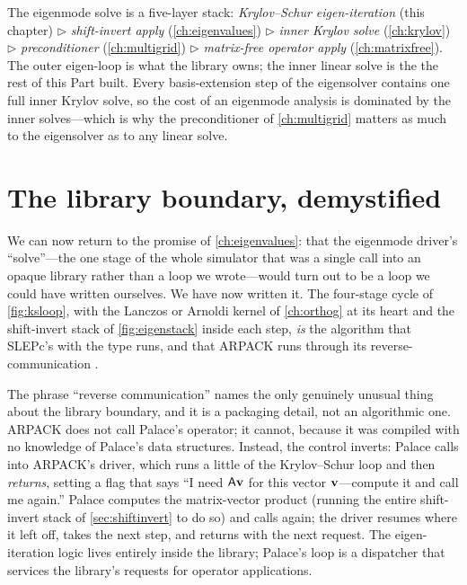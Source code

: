 \begin{keyidea}
The eigenmode solve is a five-layer stack: \emph{Krylov--Schur eigen-iteration} (this chapter)
$\triangleright$ \emph{shift-invert apply} (\cref{ch:eigenvalues}) $\triangleright$ \emph{inner
Krylov solve} (\cref{ch:krylov}) $\triangleright$ \emph{preconditioner} (\cref{ch:multigrid})
$\triangleright$ \emph{matrix-free operator apply} (\cref{ch:matrixfree}). The outer eigen-loop is
what the library owns; the inner linear solve is the  the rest of this Part built.
Every basis-extension step of the eigensolver contains one full inner Krylov solve, so the cost of
an eigenmode analysis is dominated by the inner solves---which is why the preconditioner of
\cref{ch:multigrid} matters as much to the eigensolver as to any linear solve.
\end{keyidea}

\section{The library boundary, demystified}
\label{sec:libraryboundary}

We can now return to the promise of \cref{ch:eigenvalues}: that the eigenmode driver's
``solve''---the one stage of the whole simulator that was a single call into an opaque library
rather than a loop we wrote---would turn out to be a loop we could have written ourselves. We have
now written it. The four-stage cycle of \cref{fig:ksloop}, with the Lanczos or Arnoldi kernel of
\cref{ch:orthog} at its heart and the shift-invert stack of \cref{fig:eigenstack} inside each step,
\emph{is} the algorithm that SLEPc's  with the  type runs, and
that ARPACK runs through its reverse-communication .

The phrase ``reverse communication'' names the only genuinely unusual thing about the library
boundary, and it is a packaging detail, not an algorithmic one. ARPACK does not call Palace's
operator; it cannot, because it was compiled with no knowledge of Palace's data structures.
Instead, the control inverts: Palace calls into ARPACK's  driver, which runs a little
of the Krylov--Schur loop and then \emph{returns}, setting a flag that says ``I need
$\mathsf{A}\mathbf{v}$ for this vector $\mathbf{v}$---compute it and call me again.'' Palace computes the matrix-vector
product (running the entire shift-invert stack of \cref{sec:shiftinvert} to do so) and calls
 again; the driver resumes where it left off, takes the next step, and returns with the
next request. The eigen-iteration logic lives entirely inside the library; Palace's loop is a
dispatcher that services the library's requests for operator applications.

